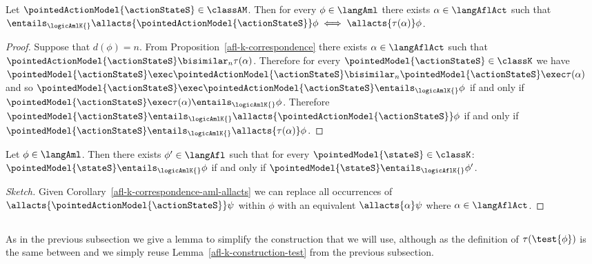 \documentclass[twoside]{aiml14}
\begin{document}
  \begin{corollary}\label{afl-k-correspondence-aml-allacts}
      Let $\pointedActionModel{\actionStateS} \in \classAM$.
      Then for every $\phi \in \langAml$
      there exists $\alpha \in \langAflAct$ 
      such that $\entails_\logicAmlK{} \allacts{\pointedActionModel{\actionStateS}} \phi \iff \allacts{\tau(\alpha)} \phi$.
  \end{corollary}

  \begin{proof}
      Suppose that $d(\phi) = n$.
      From Proposition~\ref{afl-k-correspondence} 
      there exists $\alpha \in \langAflAct$ 
      such that $\pointedActionModel{\actionStateS} \bisimilar_n \tau(\alpha)$.
      Therefore for every $\pointedModel{\actionStateS} \in \classK$
      we have $\pointedModel{\actionStateS} \exec \pointedActionModel{\actionStateS} \bisimilar_n \pointedModel{\actionStateS} \exec \tau(\alpha)$
      and so $\pointedModel{\actionStateS} \exec \pointedActionModel{\actionStateS} \entails_\logicAmlK{} \phi$
      if and only if $\pointedModel{\actionStateS} \exec \tau(\alpha) \entails_\logicAmlK{} \phi$.
      Therefore $\pointedModel{\actionStateS} \entails_\logicAmlK{} \allacts{\pointedActionModel{\actionStateS}}  \phi$
      if and only if $\pointedModel{\actionStateS} \entails_\logicAmlK{} \allacts{\tau(\alpha)}  \phi$.
  \end{proof}

  \begin{corollary}\label{afl-k-correspondence-afl-aml}
      Let $\phi \in \langAml$. 
      Then there exists $\phi' \in \langAfl$ 
      such that for every $\pointedModel{\stateS} \in \classK$: 
      $\pointedModel{\stateS} \entails_\logicAmlK{} \phi$ if and only if
      $\pointedModel{\stateS} \entails_\logicAflK{} \phi'$.
  \end{corollary}

  \begin{proof}[Sketch]
      Given Corollary~\ref{afl-k-correspondence-aml-allacts} we can replace all
      occurrences of $\allacts{\pointedActionModel{\actionStateS}} \psi$ 
      within $\phi$ with an equivalent $\allacts{\alpha} \psi$ 
      where $\alpha \in \langAflAct$.
  \end{proof}

  \subsection{\classKFF{}}

  As in the previous subsection we give a lemma to simplify the construction
  that we will use, although as the definition of $\tau(\test{\phi})$ is the
  same between \classK{} and \classKFF{} we simply reuse
  Lemma~\ref{afl-k-construction-test} from the previous subsection.
\end{document}
